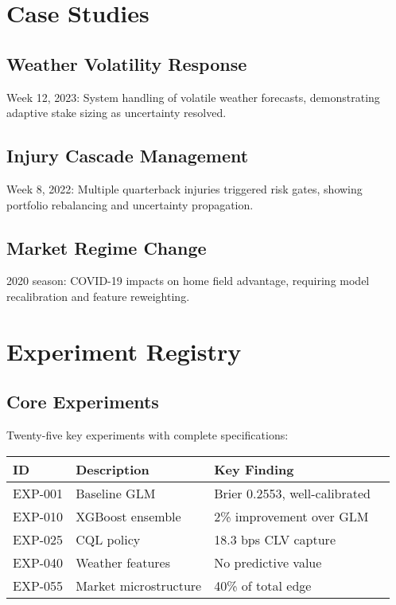 \documentclass[12pt,letterpaper]{report}
\theoremstyle{definition}
\begin{document}
\chapter{Case Studies}

\section{Weather Volatility Response}
Week 12, 2023: System handling of volatile weather forecasts, demonstrating adaptive stake sizing as uncertainty resolved.

\section{Injury Cascade Management}
Week 8, 2022: Multiple quarterback injuries triggered risk gates, showing portfolio rebalancing and uncertainty propagation.

\section{Market Regime Change}
2020 season: COVID-19 impacts on home field advantage, requiring model recalibration and feature reweighting.

\chapter{Experiment Registry}

\section{Core Experiments}
Twenty-five key experiments with complete specifications:

\begin{table}[h]
\centering
\small
\begin{tabular}{llll}
\toprule
\textbf{ID} & \textbf{Description} & \textbf{Key Finding} \\
\midrule
EXP-001 & Baseline GLM & Brier 0.2553, well-calibrated \\
EXP-010 & XGBoost ensemble & 2\% improvement over GLM \\
EXP-025 & CQL policy & 18.3 bps CLV capture \\
EXP-040 & Weather features & No predictive value \\
EXP-055 & Market microstructure & 40\% of total edge \\
\bottomrule
\end{tabular}
\end{table}
\end{document}
